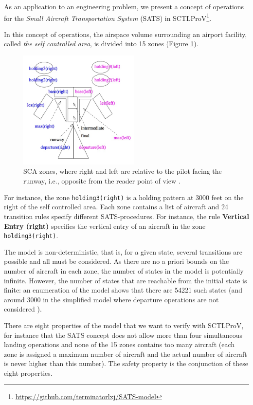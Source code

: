 \documentclass[runningheads]{llncs}
\begin{document}
\begin{example} 
	As an application to an engineering problem, we present
	a concept of operations for the {\em Small Aircraft Transportation System} 
	(\textsf{SATS}) 
	\cite{MunozDC04,nasasats04}
	in \textsf{SCTLProV}\footnote{\url{https://github.com/terminatorlxj/SATS-model}}.
	
	In this concept of operations, the airspace volume surrounding an
	airport facility, called {\em the self controlled area}, is divided into
	15 zones (Figure \ref{fig:example:sats:sca}).
	\begin{figure}
		\centering
		\includegraphics[width=6cm]{./sca.jpg}
		\caption{SCA zones, where right and left are relative to the pilot facing the runway, i.e., opposite from the reader point of view \cite{MunozDC04}.}
		\label{fig:example:sats:sca}
	\end{figure}
	For instance, the zone {\tt holding3(right)} is a holding pattern at
	3000 feet on the right of the self controlled area.
	Each zone contains a list of aircraft and 24 transition rules
	specify different SATS-procedures.
	For instance, the rule \textbf{Vertical Entry (right)}
	specifies the vertical entry of an aircraft in the zone
	{\tt holding3(right)}. 
	
	The model is
	non-deterministic, that is, for a given state, several transitions are
	possible and all must be considered.  As there are no a
	priori bounds on the number of aircraft in each zone, the number of
	states in the model is potentially infinite. However, the number of
	states that are reachable from the initial state is finite: 
	an enumeration of the model shows that there are 54221 such states (and
	around 3000 in the simplified model where departure operations are not
	considered \cite{MunozDC04}).
	
	There are eight properties of the model that we want to 
	verify with \textsf{SCTLProV}, for instance that 
	the \textsf{SATS} concept does not allow more than four simultaneous 
	landing operations and none of the 
	15 zones contains too many aircraft (each zone is
	assigned a maximum number of aircraft and the actual number of
	aircraft is never higher than this number).
	The safety property is the conjunction of these eight properties. 
	

\end{example}
\end{document}

